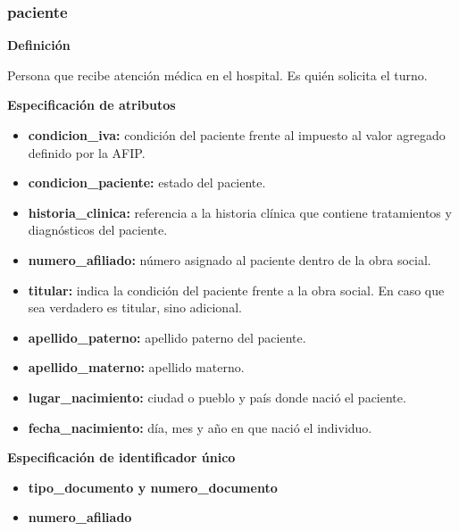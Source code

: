 \documentclass[a4paper,11pt]{article}
\begin{document}
\subsubsection{\textbf{paciente}}

\textbf{Definición}

Persona que recibe atención médica en el hospital. Es quién solicita el turno. 

\textbf{Especificación de atributos}

\begin{itemize}

  
   \item \textbf{condicion\_iva:} condición del paciente frente al impuesto al valor agregado 
   definido por la AFIP.

   \item \textbf{condicion\_paciente:} estado del paciente.

   \item \textbf{historia\_clinica:} referencia a la historia clínica que 
   contiene tratamientos y diagnósticos del paciente.

   \item \textbf{numero\_afiliado:} número asignado al paciente dentro de la obra social.

   \item \textbf{titular:} indica la condición del paciente frente a la obra social. En caso que sea verdadero es titular, sino adicional.
   
   \item \textbf{apellido\_paterno:} apellido paterno del paciente.

   \item \textbf{apellido\_materno:} apellido materno.
   
   \item \textbf{lugar\_nacimiento:} ciudad o pueblo y país donde nació el paciente.
	  
   \item \textbf{fecha\_nacimiento:} día, mes y año en que nació el individuo.
	
	\end{itemize}

\textbf{Especificación de identificador único}

\begin{itemize}

    \item \textbf{tipo\_documento y numero\_documento}

    \item \textbf{numero\_afiliado}

\end{itemize}
\end{document}
